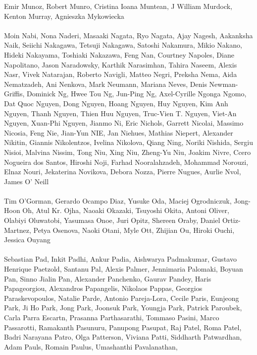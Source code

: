 \documentclass[11pt]{article}
\begin{document}
\begin{description}[itemsep=4mm, style=nextline]
Emir Munoz, 
Robert Munro, 
Cristina Ioana Muntean, 
J William Murdock, 
Kenton Murray, 
Agnieszka Mykowiecka
\\
\\
Moin Nabi, 
Nona Naderi, 
Masaaki Nagata, 
Ryo Nagata, 
Ajay Nagesh, 
Aakanksha Naik, 
Seiichi Nakagawa, 
Tetsuji Nakagawa, 
Satoshi Nakamura, 
Mikio Nakano, 
Hideki Nakayama, 
Toshiaki Nakazawa, 
Feng Nan, 
Courtney Napoles, 
Diane Napolitano, 
Jason Naradowsky, 
Karthik Narasimhan, 
Tahira Naseem, 
Alexis Nasr, 
Vivek Natarajan, 
Roberto Navigli, 
Matteo Negri, 
Preksha Nema, 
Aida Nematzadeh, 
Ani Nenkova, 
Mark Neumann, 
Mariana Neves, 
Denis Newman-Griffis, 
Dominick Ng, 
Hwee Tou Ng, 
Jun-Ping Ng, 
Axel-Cyrille Ngonga Ngomo, 
Dat Quoc Nguyen, 
Dong Nguyen, 
Hoang Nguyen, 
Huy Nguyen, 
Kim Anh Nguyen, 
Thanh Nguyen, 
Thien Huu Nguyen, 
Truc-Vien T. Nguyen, 
Viet-An Nguyen, 
Xuan-Phi Nguyen, 
Jianmo Ni, 
Eric Nichols, 
Garrett Nicolai, 
Massimo Nicosia, 
Feng Nie, 
Jian-Yun NIE, 
Jan Niehues, 
Mathias Niepert, 
Alexander Nikitin, 
Giannis Nikolentzos, 
Ivelina Nikolova, 
Qiang Ning, 
Noriki Nishida, 
Sergiu Nisioi, 
Malvina Nissim, 
Tong Niu, 
Xing Niu, 
Zheng-Yu Niu, 
Joakim Nivre, 
Ccero Nogueira dos Santos, 
Hiroshi Noji, 
Farhad Nooralahzadeh, 
Mohammad Norouzi, 
Elnaz Nouri, 
Jekaterina Novikova, 
Debora Nozza, 
Pierre Nugues, 
Aurlie Nvol, 
James O' Neill
\\
\\
Tim O'Gorman, 
Gerardo Ocampo Diaz, 
Yusuke Oda, 
Maciej Ogrodniczuk, 
Jong-Hoon Oh, 
Atul Kr. Ojha, 
Naoaki Okazaki, 
Tsuyoshi Okita, 
Antoni Oliver, 
Olabiyi Oluwatobi, 
Yasumasa Onoe, 
Juri Opitz, 
Shereen Oraby, 
Daniel Ortiz-Martnez, 
Petya Osenova, 
Naoki Otani, 
Myle Ott, 
Zhijian Ou, 
Hiroki Ouchi, 
Jessica Ouyang
\\
\\
Sebastian Pad, 
Inkit Padhi, 
Ankur Padia, 
Aishwarya Padmakumar, 
Gustavo Henrique Paetzold, 
Santanu Pal, 
Alexis Palmer, 
Jennimaria Palomaki, 
Boyuan Pan, 
Sinno Jialin Pan, 
Alexander Panchenko, 
Gaurav Pandey, 
Haris Papageorgiou, 
Alexandros Papangelis, 
Nikolaos Pappas, 
Georgios Paraskevopoulos, 
Natalie Parde, 
Antonio Pareja-Lora, 
Cecile Paris, 
Eunjeong Park, 
Ji Ho Park, 
Jong Park, 
Joonsuk Park, 
Youngja Park, 
Patrick Paroubek, 
Carla Parra Escartn, 
Prasanna Parthasarathi, 
Tommaso Pasini, 
Marco Passarotti, 
Ramakanth Pasunuru, 
Panupong Pasupat, 
Raj Patel, 
Roma Patel, 
Badri Narayana Patro, 
Olga Patterson, 
Viviana Patti, 
Siddharth Patwardhan, 
Adam Pauls, 
Romain Paulus, 
Umashanthi Pavalanathan, 

\end{description}
\end{document}
